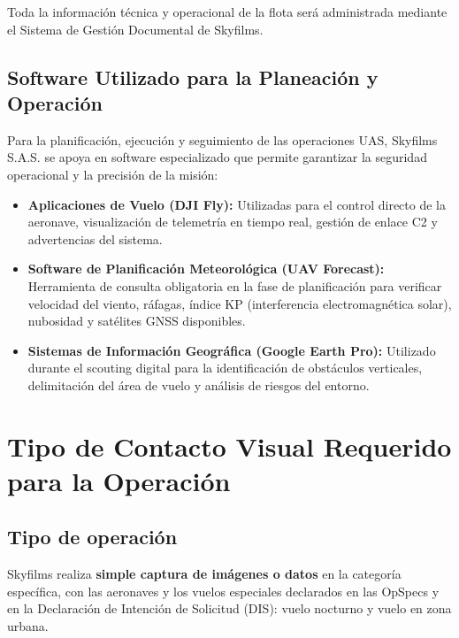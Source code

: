 Toda la información técnica y operacional de la flota será administrada mediante el Sistema de Gestión Documental de Skyfilms.

\subsection{Software Utilizado para la Planeación y Operación}
Para la planificación, ejecución y seguimiento de las operaciones UAS, Skyfilms S.A.S. se apoya en software especializado que permite garantizar la seguridad operacional y la precisión de la misión:

\begin{itemize}
    \item \textbf{Aplicaciones de Vuelo (DJI Fly):} Utilizadas para el control directo de la aeronave, visualización de telemetría en tiempo real, gestión de enlace C2 y advertencias del sistema.
    \item \textbf{Software de Planificación Meteorológica (UAV Forecast):} Herramienta de consulta obligatoria en la fase de planificación para verificar velocidad del viento, ráfagas, índice KP (interferencia electromagnética solar), nubosidad y satélites GNSS disponibles.
    \item \textbf{Sistemas de Información Geográfica (Google Earth Pro):} Utilizado durante el scouting digital para la identificación de obstáculos verticales, delimitación del área de vuelo y análisis de riesgos del entorno.
\end{itemize}



\section{Tipo de Contacto Visual Requerido para la Operación}

\subsection{Tipo de operación}
Skyfilms realiza \textbf{simple captura de imágenes o datos} en la categoría específica, con las aeronaves y los vuelos especiales declarados en las OpSpecs y en la Declaración de Intención de Solicitud (DIS): vuelo nocturno y vuelo en zona urbana.

